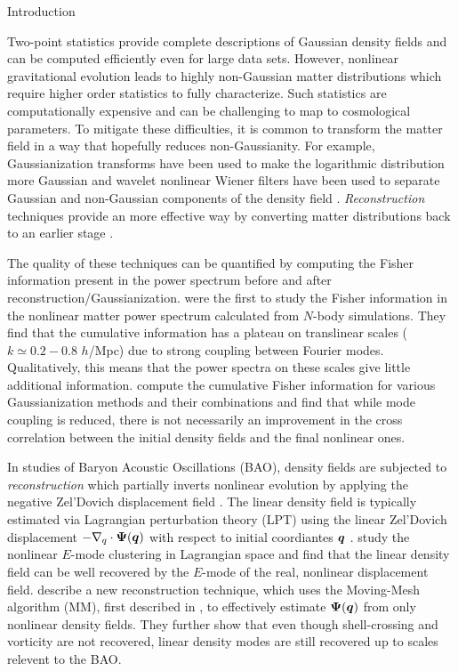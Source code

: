 \begin{section}{Introduction}\label{sec:introduction}  

  Two-point statistics provide complete descriptions of Gaussian
  density fields and can be computed efficiently even for large data
  sets.  However, nonlinear gravitational evolution leads to highly
  non-Gaussian matter distributions which require higher order
  statistics to fully characterize.  Such statistics are
  computationally expensive and can be challenging to map to
  cosmological parameters.  To mitigate these difficulties, it is
  common to transform the matter field in a way that hopefully reduces
  non-Gaussianity.  For example, Gaussianization transforms have been
  used to make the logarithmic distribution more Gaussian
  \cite{bib:Weinberg1992,bib:Mark2009} and wavelet nonlinear Wiener
  filters have been used to separate Gaussian and non-Gaussian
  components of the density field
  \cite{bib:Zhang2011,bib:Yu2012,bib:HarnoisD2013}.
  {\it Reconstruction} techniques \citep{bib:Daniel2007} provide an more
  effective way by converting matter distributions back to an
  earlier stage \citep{bib:HarnoisD2013}.

  The quality of these techniques can be quantified by computing the Fisher
  information \citep{bib:Rimes2006} present in the power spectrum before and after
  reconstruction/Gaussianization.
  \citet{bib:Rimes2006} were the first to study the Fisher information in the nonlinear
  matter power spectrum calculated from $N$-body simulations.  They
  find that the cumulative information has a plateau on translinear scales
  ($k \simeq 0.2-0.8$ $h$/Mpc) due to strong coupling between Fourier
  modes.  Qualitatively, this means that the power spectra on these
  scales give little additional information.  
  \citet{bib:HarnoisD2013} compute the cumulative Fisher information
  for various Gaussianization methods and their combinations
  and find that while mode coupling is reduced, there is not
  necessarily an improvement in the cross correlation between the
  initial density fields and the final nonlinear ones. 

  In studies of Baryon Acoustic Oscillations (BAO), density fields are
  subjected to {\it reconstruction} which partially inverts nonlinear
  evolution by applying the negative Zel'Dovich displacement field \cite{bib:Eisenstein2007}.
  The linear density field is
  typically estimated via Lagrangian perturbation theory (LPT)
  using the linear Zel'Dovich displacement $-\nabla_q\cdot\boldsymbol\Psi(\boldsymbol q)$
  with respect to initial coordiantes $\boldsymbol{q}$ \cite{bib:Zel1970}.
  \citet{bib:Yu2016} study the nonlinear $E$-mode clustering in Lagrangian
  space and find that the linear density field can be well recovered by
  the $E$-mode of the real, nonlinear displacement field.
  \citet{bib:Zhu2016} describe a new reconstruction technique, which uses
  the Moving-Mesh
  algorithm (MM), first described in \cite{bib:Pen1995,bib:Pen1998},
  to effectively estimate $\boldsymbol{\Psi}(\boldsymbol{q})$ from only nonlinear
  density fields.  They further show that even though shell-crossing
  and vorticity are not recovered, linear density modes are still 
  recovered up to scales relevent to the BAO.


\end{section}
